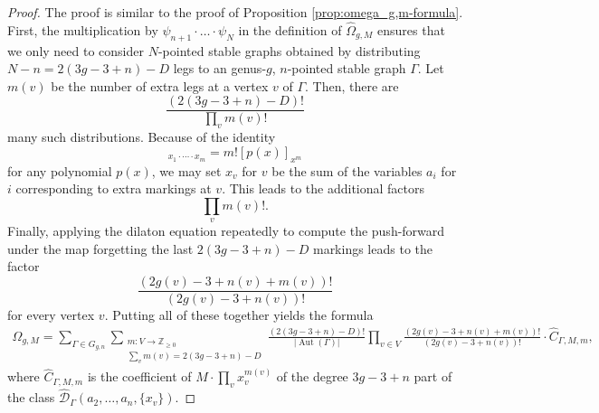 \documentclass[12pt,reqno]{amsart}
\DeclareMathOperator{\Aut}{Aut}
\theoremstyle{plain}
\theoremstyle{definition}
\theoremstyle{remark}
\begin{document}
\begin{proof}
The proof is similar to the proof of Proposition \ref{prop:omega_g,m-formula}.   First, the multiplication by $\psi_{n+1} \cdot \dots \cdot \psi_N$
  in the definition of $\widehat{\Omega}_{g, M}$ ensures that we only need to
  consider $N$-pointed stable graphs obtained by distributing
  $N-n = 2(3g-3+n)-D$ legs to an genus-$g$, $n$-pointed stable graph
  $\Gamma$.
  Let $m(v)$ be the number of extra legs at a vertex $v$ of $\Gamma$.
  Then, there are
  \begin{equation*}
    \frac{(2(3g-3+n)-D)!}{\prod_v m(v)!}
  \end{equation*}
  many such distributions.
  Because of the identity
  \begin{equation*}
    [p(x_1 + \dotsb + x_m)]_{x_1 \cdot \dotsb \cdot x_m}
    = m! [p(x)]_{x^m}
  \end{equation*}
  for any polynomial $p(x)$, we may set $x_v$ for $v$ be the
  sum of the variables $a_i$ for $i$ corresponding to extra markings
  at $v$.
  This leads to the additional factors
  \begin{equation*}
\prod_{v} m(v)!.  \end{equation*}
  Finally, applying the dilaton equation repeatedly to compute the
  push-forward under the map forgetting the last $2(3g-3+n)-D$ markings
  leads to the factor
  \begin{equation*}
    \frac{(2g(v) - 3 + n(v) + m(v))!}{(2g(v) - 3 + n(v))!}
  \end{equation*}
  for every vertex $v$.
  Putting all of these together yields the formula
  \begin{align}\label{eqn:hat-omega_g,m-formula}
   \widehat{\Omega}_{g, M}
    = \sum_{\Gamma\in G_{g,n}} \sum_{\substack{m\colon V \to \mathbb Z_{\ge 0} \\ \sum_v m(v) = 2(3g-3+n)-D}}
    \frac{(2(3g-3+n)-D)!}{|\Aut(\Gamma)|}
    \prod_{v \in V} \frac{(2g(v) - 3 + n(v) + m(v))!}{(2g(v) - 3 + n(v))!} \cdot \widehat{C}_{\Gamma, M, m},
  \end{align}
  where 
  $\widehat{C}_{\Gamma, M, m}$ is the coefficient of
  $M \cdot \prod_v x_v^{m(v)}$ of the degree $3g-3+n$ part of
  the class $\widehat{\mathcal{D}}_{\Gamma}(a_2, \dotsc, a_n, \{x_v\})$.



\end{proof}
\end{document}
